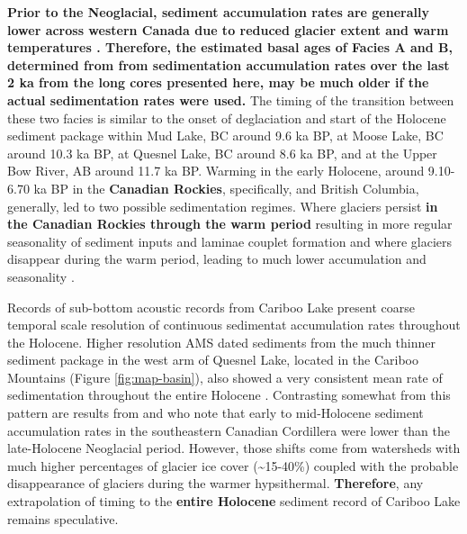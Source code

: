 \documentclass[Royal,times,doublespace,sageh]{sagej}
\begin{document}
\textbf{Prior to the Neoglacial, sediment accumulation rates are
generally lower across western Canada due to reduced glacier extent and
warm temperatures
\citep{Steinman2019, Menounos2004, Koch2007a, Osborn2007, Luckman1988, Luckman1993}.
Therefore, the estimated basal ages of Facies A and B, determined from
from sedimentation accumulation rates over the last 2 ka from the long
cores presented here, may be much older if the actual sedimentation
rates were used.} The timing of the transition between these two facies
is similar to the onset of deglaciation and start of the Holocene
sediment package within Mud Lake, BC \citep{Hodder2006b} around 9.6 ka
BP, at Moose Lake, BC \citep{Desloges1999} around 10.3 ka BP, at Quesnel
Lake, BC \citep{Gilbert2012} around 8.6 ka BP, and at the Upper Bow
River, AB \citep{Leonard1999} around 11.7 ka BP. Warming in the early
Holocene, around 9.10-6.70 ka BP in the \textbf{Canadian Rockies},
specifically, \citep{Luckman1986} and British Columbia, generally,
\citep{Clague1989, Steinman2019} led to two possible sedimentation
regimes. Where glaciers persist \textbf{in the Canadian Rockies through
the warm period} resulting in more regular seasonality of sediment
inputs and laminae couplet formation \citep[e.g.~Mud
Lake,][]{Hodder2006b} and where glaciers disappear during the warm
period, leading to much lower accumulation and seasonality
\citep[e.g.~Moose Lake,][]{Desloges1999}.

Records of sub-bottom acoustic records from Cariboo Lake present coarse
temporal scale resolution of continuous sedimentat accumulation rates
throughout the Holocene. Higher resolution AMS dated sediments from the
much thinner sediment package in the west arm of Quesnel Lake, located
in the Cariboo Mountains (Figure \ref{fig:map-basin}), also showed a
very consistent mean rate of sedimentation throughout the entire
Holocene \citep{Gilbert2012}. Contrasting somewhat from this pattern are
results from \citet{Menounos2004} and \citet{Desloges1999} who note that
early to mid-Holocene sediment accumulation rates in the southeastern
Canadian Cordillera were lower than the late-Holocene Neoglacial period.
However, those shifts come from watersheds with much higher percentages
of glacier ice cover (\textasciitilde15-40\%) coupled with the probable
disappearance of glaciers during the warmer hypsithermal.
\textbf{Therefore}, any extrapolation of timing to the \textbf{entire
Holocene} sediment record of Cariboo Lake remains speculative.
\end{document}

